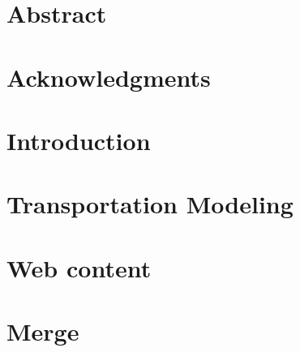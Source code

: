 \documentclass[12pt, a4paper, final]{report}
\begin{document}
\setlength{\parskip}{1em}


\newpage
\null
\newpage



\chapter*{Abstract}


\chapter*{Acknowledgments}


\setlength{\parskip}{0em}
\tableofcontents
\setlength{\parskip}{1em}

\chapter*{Introduction}


\chapter{Transportation Modeling}




\chapter{Web content}




\chapter{Merge}


\end{document}
